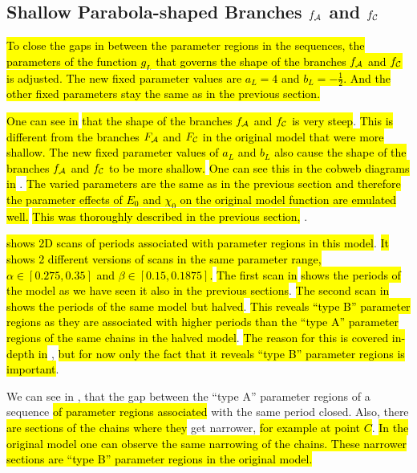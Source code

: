 \subsection{Shallow Parabola-shaped Branches $f_{\mathcal{A}}$ and $f_{\mathcal{C}}$}
\label{sec:setup.quad.hyper.2}

\hl{
	To close the gaps in between the parameter regions in the sequences, the parameters of the function $g_L$ that governs the shape of the branches $f_{\mathcal{A}}$ and $f_{\mathcal{C}}$ is adjusted.
	The new fixed parameter values are $a_L = 4$ and $b_L = -\frac{1}{2}$.
	And the other fixed parameters stay the same as in the previous section.
}

\hl{One can see in}  \hl{that the shape of the branches $f_{\mathcal{A}}$ and $f_{\mathcal{C}}$ is very steep}.
\hl{
	This is different from the branches $F_{\mathcal{A}}$ and $F_{\mathcal{C}}$ in the original model that were more shallow.
	The new fixed parameter values of $a_L$ and $b_L$ also cause the shape of the branches $f_{\mathcal{A}}$ and $f_{\mathcal{C}}$ to be more shallow.
}
\hl{One can see this in the cobweb diagrams in} .
\hl{
	The varied parameters are the same as in the previous section and therefore the parameter effects of $E_0$ and $\chi_0$ on the original model function are emulated well.
}
\hl{This was thoroughly described in the previous section,} .

 \hl{shows 2D scans of periods associated with parameter regions in this model}.
\hl{
	It shows 2 different versions of scans in the same parameter range, $\alpha \in [0.275, 0.35]$ and $\beta \in [0.15, 0.1875]$.
}
\hl{The first scan in}  \hl{shows the periods of the model as we have seen it also in the previous sections}.
\hl{The second scan in}  \hl{shows the periods of the same model but halved}.
\hl{This reveals ``type B'' parameter regions as they are associated with higher periods than the ``type A'' parameter regions of the same chains in the halved model}.
\hl{The reason for this is covered in-depth in} , \hl{but for now only the fact that it reveals ``type B'' parameter regions is important}.

We can see in , that the gap between the ``type A'' parameter regions of a sequence \hl{of parameter regions associated} with the same period closed.
Also, there \hl{are sections of the chains where they} get narrower, \hl{for example at point $C$}.
\hl{
	In the original model one can observe the same narrowing of the chains.
	These narrower sections are ``type B'' parameter regions in the original model.
}



